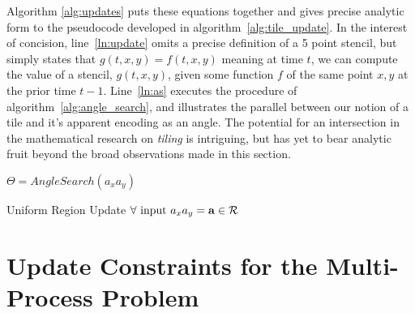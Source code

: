 Algorithm \ref{alg:updates}
puts these equations together and gives precise analytic form to
the pseudocode developed in algorithm~\ref{alg:tile_update}.
In the interest of concision, line~\ref{ln:update} omits a precise definition of a 5
point stencil, but simply states that $g(t,x,y) = f(t,x,y)$ meaning at time
$t$, we can compute the value of a stencil, $g(t,x,y)$, given some function $f$
of the same point $x,y$ at the prior time $t-1$.
Line~\ref{ln:as} executes the procedure of algorithm~\ref{alg:angle_search},
and illustrates the parallel between our notion of a tile and
it's apparent encoding as an angle.  The potential for
an intersection in the mathematical research on {\it tiling} is
intriguing, but has yet to bear analytic fruit beyond the broad
observations made in this section.
\begin{algorithm}[h]
  \setcounter{AlgoLine}{0}
  $\Theta = AngleSearch(a_xa_y)$\; \label{ln:as}

  \caption{Uniform Region Update $\forall \text{ input } a_xa_y = \mathbf{a} \in \mathcal{R}$}
  \label{alg:updates}
\end{algorithm}

\section{Update Constraints for the Multi-Process Problem}


